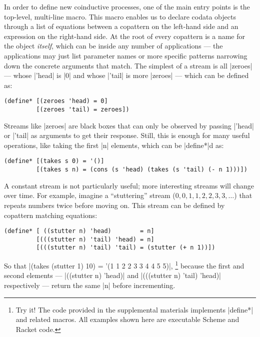In order to define new coinductive processes, one of the main entry points is the top-level, multi-line  macro.
This macro enables us to declare codata objects through a list of equations between a copattern on the left-hand side and an expression on the right-hand side.
At the root of every copattern is a name for the object \emph{itself}, which can be inside any number of applications --- the applications may just list parameter names or more specific patterns narrowing down the concrete arguments that match.
The simplest of a stream is all \scm|zeroes| --- whose \scm|'head| is \scm|0| and whose \scm|'tail| is more \scm|zeroes| --- which can be defined as:
\begin{verbatim}
(define* [(zeroes 'head) = 0]
         [(zeroes 'tail) = zeroes])
\end{verbatim}
Streams like \scm|zeroes| are black boxes that can only be observed by passing \scm|'head| or \scm|'tail| as arguments to get their response.
Still, this is enough for many useful operations, like taking the first \scm|n| elements, which can be \scm|define*|d as:
\begin{verbatim}
(define* [(takes s 0) = '()]
         [(takes s n) = (cons (s 'head) (takes (s 'tail) (- n 1)))])
\end{verbatim}
A constant stream is not particularly useful; more interesting streams will change over time.
For example, imagine a ``stuttering'' stream ($0, 0, 1, 1, 2, 2, 3, 3, \dots$) that repeats numbers twice before moving on.
This stream can be defined by copattern matching equations:
\begin{verbatim}
(define* [ ((stutter n) 'head)        = n]
         [(((stutter n) 'tail) 'head) = n]
         [(((stutter n) 'tail) 'tail) = (stutter (+ n 1))])
\end{verbatim}
So that \scm|(takes (stutter 1) 10) = '(1 1 2 2 3 3 4 4 5 5)|,%
\footnote{
  Try it!
  The code provided in the supplemental materials implements \scm|define*| and related macros.
  All examples shown here are executable Scheme and Racket code.
}
because the first and second elements --- \scm|((stutter n) 'head)| and \scm|(((stutter n) 'tail) 'head)| respectively --- return the same \scm|n| before incrementing.

